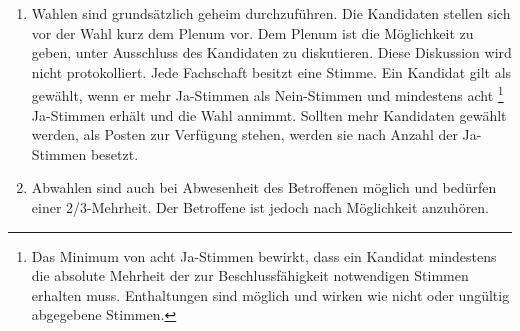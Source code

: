 \begin{enumerate}
  \item Wahlen sind grundsätzlich geheim durchzuführen. Die Kandidaten stellen sich vor der Wahl kurz
        dem Plenum vor. Dem Plenum ist die Möglichkeit zu geben, unter Ausschluss des Kandidaten zu
        diskutieren. Diese Diskussion wird nicht protokolliert. Jede Fachschaft besitzt eine Stimme. Ein Kandidat gilt als gewählt,
        wenn er mehr Ja-Stimmen als Nein-Stimmen und mindestens acht \footnote{Das Minimum von acht Ja-Stimmen bewirkt, dass ein Kandidat mindestens
        die absolute Mehrheit der zur Beschlussfähigkeit notwendigen Stimmen erhalten
        muss. Enthaltungen sind möglich und wirken wie nicht oder ungültig abgegebene Stimmen.}  Ja-Stimmen erhält und die Wahl
        annimmt. Sollten mehr Kandidaten gewählt werden, als Posten zur
        Verfügung stehen, werden sie nach Anzahl der Ja-Stimmen besetzt.
  
  \item Abwahlen sind auch bei Abwesenheit des Betroffenen möglich und bedürfen einer 2/3-Mehrheit.
        Der Betroffene ist jedoch nach Möglichkeit anzuhören.
\end{enumerate}



